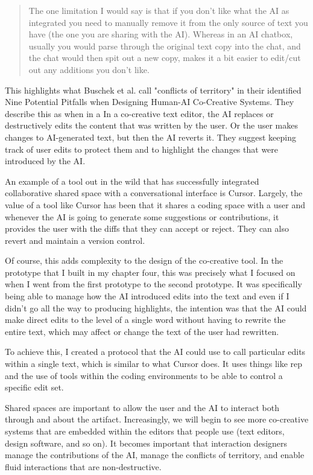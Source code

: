 \begin{quote}
    The one limitation I would say is that if you don't like what the AI as integrated you need to manually remove it from the only source of text you have (the one you are sharing with the AI). Whereas in an AI chatbox, usually you would parse through the original text copy into the chat, and the chat would then spit out a new copy, makes it a bit easier to edit/cut out any additions you don't like.
\end{quote}


This highlights what Buschek et al. \cite{Buschek2021-ks} call "conflicts of territory" in their identified Nine Potential Pitfalls when Designing Human-AI Co-Creative Systems. They describe this as when in a In a co-creative text editor, the AI replaces or destructively edits the content that was written by the user. Or the user makes changes to AI-generated text, but then the AI reverts it. They suggest keeping track of user edits to protect them and to highlight the changes that were introduced by the AI. 

An example of a tool out in the wild that has successfully integrated collaborative shared space with a conversational interface is Cursor. Largely, the value of a tool like Cursor has been that it shares a coding space with a user and whenever the AI is going to generate some suggestions or contributions, it provides the user with the diffs that they can accept or reject. They can also revert and maintain a version control. 

Of course, this adds complexity to the design of the co-creative tool. In the prototype that I built in my chapter four, this was precisely what I focused on when I went from the first prototype to the second prototype. It was specifically being able to manage how the AI introduced edits into the text and even if I didn't go all the way to producing highlights, the intention was that the AI could make direct edits to the level of a single word without having to rewrite the entire text, which may affect or change the text of the user had rewritten. 

To achieve this, I created a protocol that the AI could use to call particular edits within a single text, which is similar to what Cursor does. It uses things like rep and the use of tools within the coding environments to be able to control a specific edit set. 

Shared spaces are important to allow the user and the AI to interact both through and about the artifact. Increasingly, we will begin to see more co-creative systems that are embedded within the editors that people use (text editors, design software, and so on). It becomes important that interaction designers manage the contributions of the AI, manage the conflicts of territory, and enable fluid interactions that are non-destructive. 

